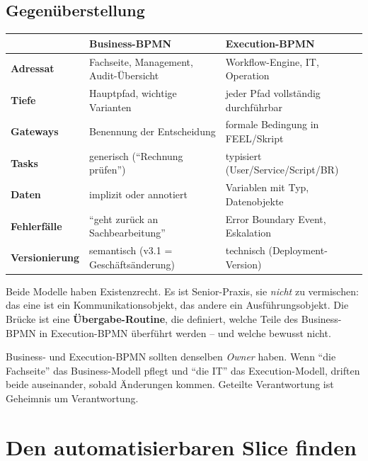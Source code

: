 \documentclass[11pt,a4paper,oneside]{article}
\newcommand{\fachbegriff}[1]{\textbf{#1}}
\begin{document}
\subsection{Gegenüberstellung}

\begin{tabularx}{\linewidth}{@{}l X X@{}}
\toprule
& \textbf{Business-BPMN} & \textbf{Execution-BPMN} \\
\midrule
\textbf{Adressat} & Fachseite, Management, Audit-Übersicht & Workflow-Engine, IT, Operation \\
\textbf{Tiefe} & Hauptpfad, wichtige Varianten & jeder Pfad vollständig durchführbar \\
\textbf{Gateways} & Benennung der Entscheidung & formale Bedingung in FEEL/Skript \\
\textbf{Tasks} & generisch (``Rechnung prüfen'') & typisiert (User/Service/Script/BR) \\
\textbf{Daten} & implizit oder annotiert & Variablen mit Typ, Datenobjekte \\
\textbf{Fehlerfälle} & ``geht zurück an Sachbearbeitung'' & Error Boundary Event, Eskalation \\
\textbf{Versionierung} & semantisch (v3.1 = Geschäftsänderung) & technisch (Deployment-Version) \\
\bottomrule
\end{tabularx}

\medskip

\noindent Beide Modelle haben Existenzrecht. Es ist Senior-Praxis, sie \emph{nicht} zu vermischen: das eine ist ein Kommunikationsobjekt, das andere ein Ausführungsobjekt. Die Brücke ist eine \fachbegriff{Übergabe-Routine}, die definiert, welche Teile des Business-BPMN in Execution-BPMN überführt werden -- und welche bewusst nicht.

\begin{merkbox}
Business- und Execution-BPMN sollten denselben \emph{Owner} haben. Wenn ``die Fachseite'' das Business-Modell pflegt und ``die IT'' das Execution-Modell, driften beide auseinander, sobald Änderungen kommen. Geteilte Verantwortung ist Geheimnis um Verantwortung.
\end{merkbox}

\section{Den automatisierbaren Slice finden}
\end{document}
